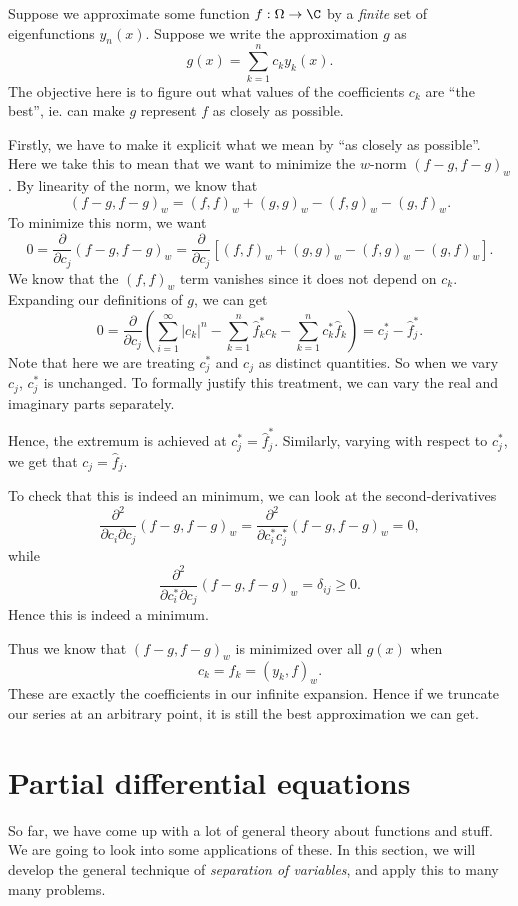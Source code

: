 \documentclass[a4paper]{article}
\begin{document}
Suppose we approximate some function $f: \Omega \to \C$ by a \emph{finite} set of eigenfunctions $y_n(x)$. Suppose we write the approximation $g$ as
\[
  g(x) = \sum_{k = 1}^n c_k y_k(x).
\]
The objective here is to figure out what values of the coefficients $c_k$ are ``the best'', ie. can make $g$ represent $f$ as closely as possible.

Firstly, we have to make it explicit what we mean by ``as closely as possible''. Here we take this to mean that we want to minimize the $w$-norm $(f - g, f - g)_w$. By linearity of the norm, we know that
\[
  (f - g, f - g)_w = (f, f)_w + (g, g)_w - (f, g)_w - (g, f)_w.
\]
To minimize this norm, we want
\[
  0 = \frac{\partial}{\partial c_j} (f - g, f - g)_w = \frac{\partial}{\partial c_j}[(f, f)_w + (g, g)_w - (f, g)_w - (g, f)_w].
\]
We know that the $(f, f)_w$ term vanishes since it does not depend on $c_k$. Expanding our definitions of $g$, we can get
\[
  0 = \frac{\partial}{\partial c_j}\left(\sum_{i = 1}^\infty |c_k|^n - \sum_{k = 1}^n \hat{f}_k^* c_k - \sum_{k = 1}^n c_k^* \hat{f}_k\right) = c^*_j - \hat{f}_j^*.
\]
Note that here we are treating $c_j^*$ and $c_j$ as distinct quantities. So when we vary $c_j$, $c_j^*$ is unchanged. To formally justify this treatment, we can vary the real and imaginary parts separately.

Hence, the extremum is achieved at $c_j^* = \hat{f}_j^*$. Similarly, varying with respect to $c_j^*$, we get that $c_j = \hat{f}_j$.

To check that this is indeed an minimum, we can look at the second-derivatives
\[
  \frac{\partial^2}{\partial c_i \partial c_j} (f - g, f - g)_w = \frac{\partial^2}{\partial c_i^* c_j^*} (f - g, f - g)_w = 0,
\]
while
\[
  \frac{\partial^2}{\partial c_i^* \partial c_j} (f - g, f - g)_w = \delta_{ij} \geq 0.
\]
Hence this is indeed a minimum.

Thus we know that $(f - g, f - g)_w$ is minimized over all $g(x)$ when
\[
  c_k = \hat{f}_k = (y_k, f)_w.
\]
These are exactly the coefficients in our infinite expansion. Hence if we truncate our series at an arbitrary point, it is still the best approximation we can get.

\section{Partial differential equations}
So far, we have come up with a lot of general theory about functions and stuff. We are going to look into some applications of these. In this section, we will develop the general technique of \emph{separation of variables}, and apply this to many many problems.
\end{document}

